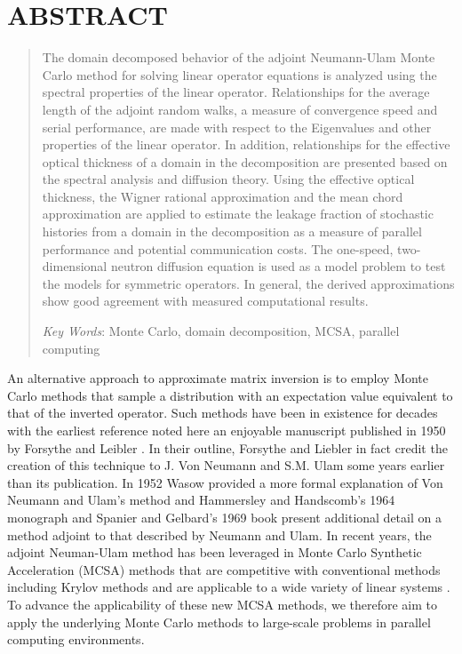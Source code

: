 \documentclass{mc2013}
\begin{document}
\section*{ABSTRACT} 
\begin{quote}
\begin{small}
The domain decomposed behavior of the adjoint Neumann-Ulam Monte Carlo
method for solving linear operator equations is analyzed using the
spectral properties of the linear operator. Relationships for the
average length of the adjoint random walks, a measure of convergence
speed and serial performance, are made with respect to the Eigenvalues
and other properties of the linear operator. In addition,
relationships for the effective optical thickness of a domain in the
decomposition are presented based on the spectral analysis and
diffusion theory. Using the effective optical thickness, the Wigner
rational approximation and the mean chord approximation are applied to
estimate the leakage fraction of stochastic histories from a domain in
the decomposition as a measure of parallel performance and potential
communication costs. The one-speed, two-dimensional neutron diffusion
equation is used as a model problem to test the models for symmetric
operators. In general, the derived approximations show good agreement
with measured computational results.

\emph{Key Words}: Monte Carlo, domain decomposition, MCSA, parallel
computing
\end{small} 
\end{quote}

\setlength{\baselineskip}{14pt}
\normalsize

\label{sec:intro}

An alternative approach to approximate matrix inversion is to employ
Monte Carlo methods that sample a distribution with an expectation
value equivalent to that of the inverted operator. Such methods have
been in existence for decades with the earliest reference noted here
an enjoyable manuscript published in 1950 by Forsythe and Leibler
\cite{forsythe_matrix_1950}. In their outline, Forsythe and Liebler in
fact credit the creation of this technique to J. Von Neumann and
S.M. Ulam some years earlier than its publication. In 1952 Wasow
provided a more formal explanation of Von Neumann and Ulam's method
\cite{wasow_note_1952} and Hammersley and Handscomb's 1964 monograph
\cite{hammersley_monte_1964} and Spanier and Gelbard's 1969 book
\cite{spanier_monte_1969} present additional detail on a method
adjoint to that described by Neumann and Ulam. In recent years, the
adjoint Neuman-Ulam method has been leveraged in Monte Carlo Synthetic
Acceleration (MCSA) methods that are competitive with conventional
methods including Krylov methods and are applicable to a wide variety
of linear systems \cite{evans_monte_2009,evans_monte_2012}. To advance
the applicability of these new MCSA methods, we therefore aim to apply
the underlying Monte Carlo methods to large-scale problems in parallel
computing environments.
\end{document}
